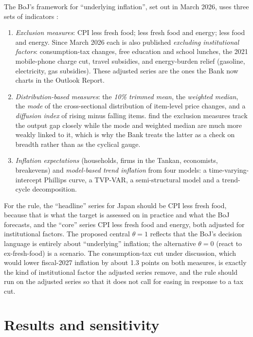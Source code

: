 \documentclass[11pt,a4paper]{article}
\begin{document}
The BoJ's framework for ``underlying inflation'', set out in March 2026, uses three sets of indicators \parencite{bojreview2026}:
\begin{enumerate}
\item \emph{Exclusion measures}: CPI less fresh food; less fresh food and energy; less food and energy. Since March 2026 each is also published \emph{excluding institutional factors}: consumption-tax changes, free education and school lunches, the 2021 mobile-phone charge cut, travel subsidies, and energy-burden relief (gasoline, electricity, gas subsidies). These adjusted series are the ones the Bank now charts in the Outlook Report.
\item \emph{Distribution-based measures}: the \emph{10\% trimmed mean}, the \emph{weighted median}, the \emph{mode} of the cross-sectional distribution of item-level price changes, and a \emph{diffusion index} of rising minus falling items. \textcite{hogen2015} find the exclusion measures track the output gap closely while the mode and weighted median are much more weakly linked to it, which is why the Bank treats the latter as a check on breadth rather than as the cyclical gauge.
\item \emph{Inflation expectations} (households, firms in the Tankan, economists, breakevens) and \emph{model-based trend inflation} from four models: a time-varying-intercept Phillips curve, a TVP-VAR, a semi-structural model and a trend-cycle decomposition.
\end{enumerate}

For the rule, the ``headline'' series for Japan should be CPI less fresh food, because that is what the target is assessed on in practice and what the BoJ forecasts, and the ``core'' series CPI less fresh food and energy, both adjusted for institutional factors. The proposed central $\theta=1$ reflects that the BoJ's decision language is entirely about ``underlying'' inflation; the alternative $\theta=0$ (react to ex-fresh-food) is a scenario. The consumption-tax cut under discussion, which would lower fiscal-2027 inflation by about 1.3 points on both measures, is exactly the kind of institutional factor the adjusted series remove, and the rule should run on the adjusted series so that it does not call for easing in response to a tax cut.

\section{Results and sensitivity}
\label{sec:results}
\end{document}
